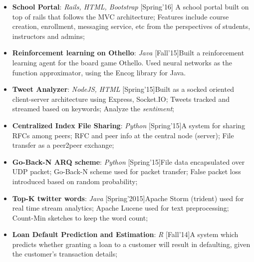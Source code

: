 \documentclass[10pt, letterpaper]{article}
\begin{document}
\begin{multicols}{2}
			\begin{itemize}[nolistsep,leftmargin=*]
				\item \textbf{School Portal}: \textit{Rails, HTML, Bootstrap} \hfill [Spring'16] \newline A school portal built on top of rails that follows the MVC architecture; Features include course creation, enrollment, messaging service, etc from the perspectives of students, instructors and admins;
				\item \textbf{Reinforcement learning on Othello}: \textit{Java} \hfill [Fall'15]\newline Built a reinforcement learning agent for the board game Othello. Used neural networks as the function approximator, using the Encog library for Java.
				\item \textbf{Tweet Analyzer}: \textit{NodeJS, HTML} \hfill [Spring'15]\newline Built as a socked oriented client-server architecture using Express, Socket.IO; Tweets tracked and streamed based on keywords; Analyze the \textit{sentiment};
				\item \textbf{Centralized Index File Sharing}: \textit{Python} \hfill [Spring'15]\newline A system for sharing RFCs among peers; RFC and peer info at the central node (server); File transfer as a peer2peer exchange; 
				\item \textbf{Go-Back-N ARQ scheme}: \textit{Python} \hfill [Spring'15]\newline File data encapsulated over UDP packet; Go-Back-N scheme used for packet transfer; False packet loss introduced based on random probability;
				\item \textbf{Top-K twitter words}: \textit{Java} \hfill [Spring'2015]\newline Apache Storm (trident) used for real time stream analytics; Apache Lucene used for text preprocessing; Count-Min sketches to keep the word count;
				\item \textbf{Loan Default Prediction and Estimation}: \textit{R} \hfill[Fall'14]\newline A system which predicts whether granting a loan to a customer will result in defaulting, given the customer's transaction details; 

\end{itemize}
\end{multicols}
\end{document}
